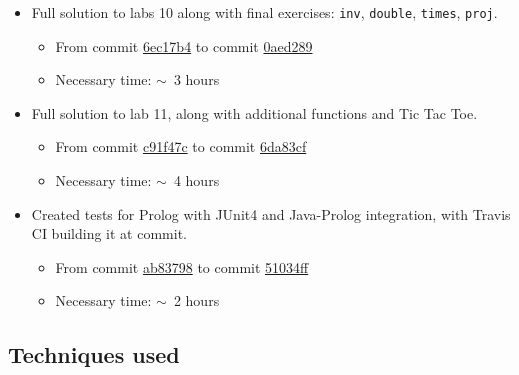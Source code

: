         \begin{itemize}
            \item 
                Full solution to labs 10 along with final exercises: \texttt{inv}, \texttt{double}, \texttt{times}, \texttt{proj}.
                \begin{itemize}
                    \item 
                        From commit \href{https://github.com/NiccoMlt/pps2017-asg03-prolog/commit/6ec17b42595bba0504936dc0f50e471af492fcbc}{6ec17b4}
                        to commit \href{https://github.com/NiccoMlt/pps2017-asg03-prolog/commit/0aed289a42569f624cef6a5fbf398b21d8b5f46b}{0aed289}
                    \item Necessary time: $\sim$~3 hours
                \end{itemize}

            \item 
                Full solution to lab 11, along with additional functions and Tic Tac Toe.
                \begin{itemize}
                    \item 
                        From commit \href{https://github.com/NiccoMlt/pps2017-asg03-prolog/commit/c91f47c1fa5a28ddef65ef72a5ad05dfd19304ea}{c91f47c}
                        to commit \href{https://github.com/NiccoMlt/pps2017-asg03-prolog/commit/6da83cfa26fff7ec16e4b5fdd3f872c505d26b4e}{6da83cf}
                    \item Necessary time: $\sim$~4 hours
                \end{itemize}

            \item 
                Created tests for Prolog with JUnit4 and Java-Prolog integration, with Travis CI building it at commit.
                \begin{itemize}
                    \item
                        From commit \href{https://github.com/NiccoMlt/pps2017-asg03-prolog/commit/ab8379820fc5f2977b4551446f4358709efe9189}{ab83798}
                        to commit \href{https://github.com/NiccoMlt/pps2017-asg03-prolog/commit/51034ff564fc238570cdb939ed122b70abbc834d}{51034ff}
                    \item Necessary time: $\sim$~2 hours
                \end{itemize}
        \end{itemize}

    \subsection*{Techniques used}


